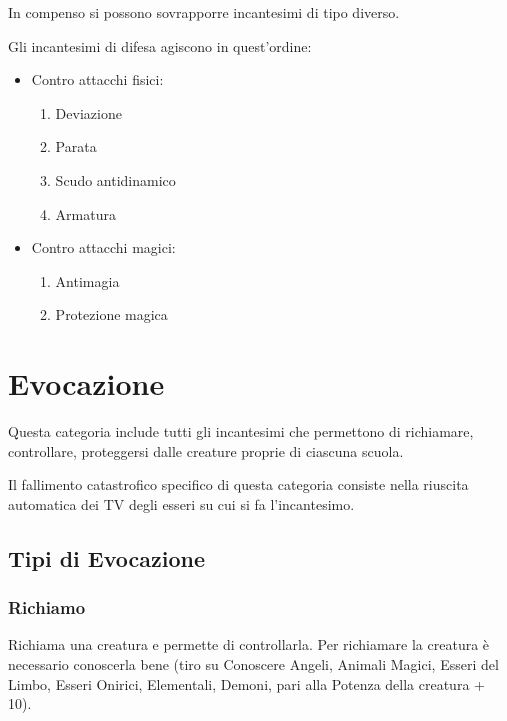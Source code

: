 
In compenso si possono sovrapporre incantesimi di tipo diverso.

Gli incantesimi di difesa agiscono in quest'ordine: 

\begin{itemize}
\item Contro attacchi fisici:
  \begin{enumerate}\itemsep -3pt
  \item Deviazione
  \item Parata
  \item Scudo antidinamico
  \item Armatura
  \end{enumerate}
\item Contro attacchi magici:
  \begin{enumerate}\itemsep -3pt
  \item Antimagia
  \item Protezione magica
  \end{enumerate}
\end{itemize}

\section{Evocazione} Questa categoria include
tutti gli incantesimi che permettono di richiamare, controllare,
proteggersi dalle creature proprie di ciascuna scuola. 

Il fallimento
catastrofico specifico di questa categoria consiste nella riuscita
automatica dei TV degli esseri su cui si fa l'incantesimo. 

\subsection{Tipi di Evocazione}

\subsubsection{Richiamo} 

Richiama una creatura e permette di controllarla. Per richiamare la
creatura \`e necessario conoscerla bene (tiro su Conoscere Angeli,
Animali Magici, Esseri del Limbo, Esseri Onirici, Elementali, Demoni,
pari alla Potenza della creatura + 10).

